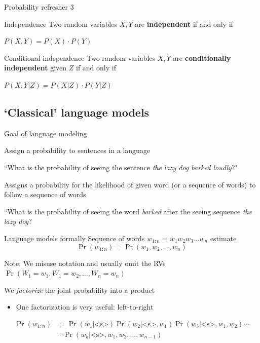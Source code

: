 \documentclass[12pt,aspectratio=169,handout]{beamer}
\begin{document}
\begin{frame}{Probability refresher 3}
	
	\begin{block}{Independence}
		Two random variables $X, Y$ are \textbf{independent} if and only if
		
		$P(X, Y) = P(X) \cdot P(Y)$
	\end{block}
	
	\pause
	
	\begin{block}{Conditional independence}
		Two random variables $X, Y$ are \textbf{conditionally independent} given $Z$ if and only if
		
		$P(X, Y | Z) = P(X|Z) \cdot P(Y|Z)$
	\end{block}
	
\end{frame}


\subsection{`Classical' language models}

\begin{frame}{Goal of language modeling}
	
	Assign a probability to sentences in a language
	
	\begin{example}
		``What is the probability of seeing the sentence \emph{the lazy dog barked loudly}?"
	\end{example}
	
	Assigns a probability for the likelihood of given word (or a sequence of words) to follow a sequence of words
	
	\begin{example}
		``What is the probability of seeing the word \emph{barked} after the seeing sequence \emph{the lazy dog}?
	\end{example}
	
\end{frame}

\begin{frame}{Language models formally}
	Sequence of words $w_{1:n} = w_1 w_2 w_3 \ldots w_n$ estimate
	$$
	\Pr(w_{1:n}) = \Pr(w_1, w_2, \ldots, w_n)
	$$
	\begin{block}{Note: We misuse notation and usually omit the RVs}
		$\Pr(W_1 = w_1, W_1 = w_2, \ldots, W_n = w_n)$
	\end{block}
	
	We \emph{factorize} the joint probability into a product
	\begin{itemize}
		\item One factorization is very useful: left-to-right
	\end{itemize}
	$$
	\begin{aligned}
	\Pr(w_{1:n}) &= \Pr(w_1 | \text{<s>}) \Pr (w_2 | \text{<s>}, w_1) \Pr(w_3 | \text{<s>}, w_1, w_2) \cdots\\
	&\cdots \Pr(w_k | \text{<s>}, w_1, w_2, \ldots, w_{n-1})
	\end{aligned}
	$$
	
\end{frame}
\end{document}
